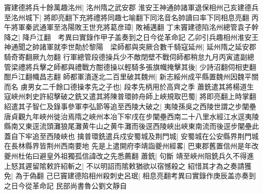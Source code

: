 竇建德將兵十餘萬趣洺州|{
	洺州隋之武安郡}
淮安王神通帥諸軍退保相州己亥建德兵至洺州城下|{
	將即亮翻下充將禮將同趣七喻翻下同洺音名帥讀曰率下同相息亮翻}
丙午將軍秦武通軍至洛陽敗王世充將葛彦璋|{
	敗補邁翻}
丁未竇建德陷洺州總管袁子幹降之|{
	降戶江翻　考異曰實錄作甲子盖奏到之日今從革命記}
乙卯引兵趣相州淮安王神通聞之帥諸軍就李世勣於黎陽　梁師都與突厥合數千騎寇延州|{
	延州隋之延安郡騎奇寄翻厥九勿翻}
行軍總管段德操兵少不敵閉壁不戰伺師都稍怠九月丙寅遣副總管梁禮將兵擊之師都與禮戰方酣德操以輕騎多張旗幟掩擊其後|{
	少詩沼翻伺相吏翻酣戶江翻幟昌志翻}
師都軍潰逐北二百里破其魏州|{
	新志綏州成平縣置魏州因魏平關而名}
虜男女二千餘口德操孝先之子也|{
	段孝先柄用於高齊之季}
蕭銑遣其將楊道生寇峽州刺史許紹擊破之銑又遣其將陳普環帥舟師上峽規取巴蜀|{
	將即亮翻上時掌翻}
紹遣其子智仁及錄事參軍李弘節等追至西陵大破之|{
	夷陵孫吳之西陵世謂之步闡壘唐貞觀九年峽州徙治焉隋之峽州本冶下牢戌在步闡壘西南二十八里水經江水逕夷陵縣南又東逕流頭灘狼尾灘黄牛山之黄牛灘而後逕西陵峽出峽東南流而後逕步闡壘此蓋自下牢追至西陵峽也}
擒普環銑遣兵戍安蜀城及荆門城|{
	安蜀城在公安縣界荆門城在長林縣界皆荆州西南要地}
先是上遣開府李靖詣夔州經畧|{
	巴東郡舊置信州是年改夔州杜佑曰避皇外祖獨孤信諱改之先悉薦翻}
蕭銑|{
	句斷}
靖至峽州阻銑兵久不得進上怒其遲留隂敕許紹斬之|{
	不以明詔而隂敕猶欲以宿憾殺之}
紹惜其才為之奏請獲免|{
	為于偽翻}
己巳竇建德陷相州殺刺史呂珉|{
	相息亮翻考異曰實錄作庚辰盖亦奏到之日今從革命記}
民部尚書魯公劉文靜自


